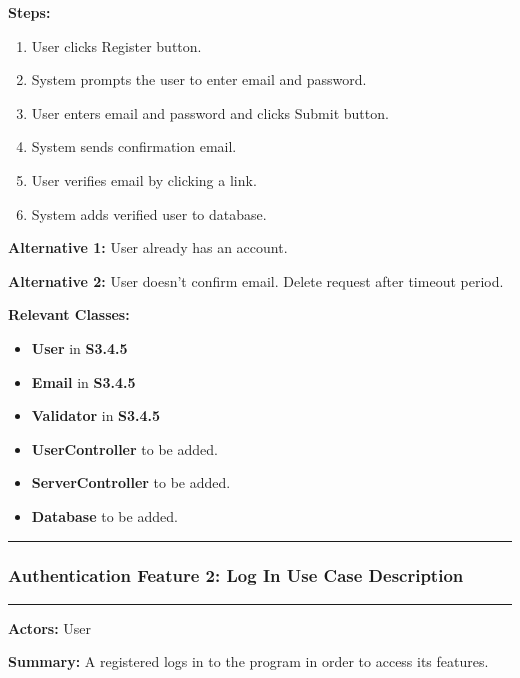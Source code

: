 \documentclass[twoside,letterpaper]{article}
\begin{document}
	\noindent\textbf{Steps:} \begin{enumerate}
		\item User clicks Register button.
		\item System prompts the user to enter email and password.
		\item User enters email and password and clicks Submit button.
		\item System sends confirmation email.
		\item User verifies email by clicking a link.
		\item System adds verified user to database.
	\end{enumerate}
	\noindent\textbf{Alternative 1:} User already has an account. \newline
	
	\noindent\textbf{Alternative 2:} User doesn't confirm email. Delete request after timeout period. \newline
	
	\noindent\textbf{Relevant Classes:}
	\begin{itemize}
		\item \textbf{User} in \textbf{S3.4.5}
		\item \textbf{Email} in \textbf{S3.4.5}
		\item \textbf{Validator} in \textbf{S3.4.5}
		\item \textbf{UserController} to be added.
		\item \textbf{ServerController} to be added.
		\item \textbf{Database} to be added.
	\end{itemize}
	\vspace{8pt}
	\hrule
	\newpage
	
	\subsubsection[Authentication Feature 2: Log In Use Case Description]{\rmfamily\bfseries\color{black}
		Authentication Feature 2: Log In Use Case Description}
		\label{a:uc2}
	\hypertarget{RefHeading22059017292}{}
	
	\hrule
	\vspace{8pt}
	\noindent\textbf{Actors:} User \newline
	
	\noindent\textbf{Summary:} A registered logs in to the program in order to access its features.  \newline
	
\end{document}
